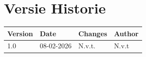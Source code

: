 \section*{Versie Historie} 

\begin{table}[h]
\begin{tabular}{|l|l|l|l|}
\hline
\rowcolor[HTML]{4472C4} 
{\color[HTML]{FFFFFF} \textbf{Version}} &
  {\color[HTML]{FFFFFF} \textbf{Date}} &
  {\color[HTML]{FFFFFF} \textbf{Changes}} &
  {\color[HTML]{FFFFFF} \textbf{Author}} \\ \hline
\rowcolor[HTML]{D9E1F2} 1.0 & \multicolumn{1}{c|}{\cellcolor[HTML]{D9E1F2}08-02-2026} & N.v.t. & N.v.t \\
\hline



\end{tabular}
\end{table}
